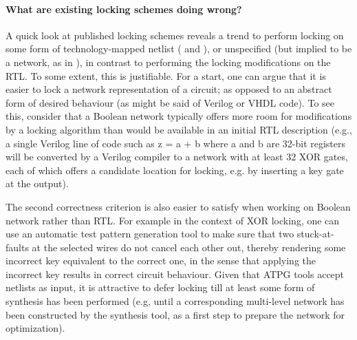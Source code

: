 
\paragraph{What are existing locking schemes doing wrong?} A quick look at published locking schemes reveals a trend to perform locking on some form of technology-mapped netlist (\cite{} and \cite{}), or unspecified (but implied to be a network, as in \cite{}), in contrast to performing the locking modifications on the RTL. To some extent, this is justifiable. For a start, one can argue that it is easier to lock a network representation of a circuit; as opposed to an abstract form of desired behaviour (as might be said of Verilog or VHDL code). To see this, consider that a Boolean network typically offers more room for modifications by a locking algorithm than would be available in an initial RTL description (e.g., a single Verilog line of code such as z = a + b where a and b are 32-bit registers will be converted by a Verilog compiler to a network with at least 32 XOR gates, each of which offers a candidate location for locking, e.g. by inserting a key gate at the output). 

The second correctness criterion is also easier to satisfy when working on Boolean network rather than RTL. For example in the context of XOR locking, one can use an automatic test pattern generation tool to make sure that two stuck-at-faults at the selected wires do not cancel each other out, thereby rendering some incorrect key equivalent to the correct one, in the sense that applying the incorrect key results in correct circuit behaviour. Given that ATPG tools accept netlists as input, it is attractive to defer locking till at least some form of synthesis has been performed (e.g, until a corresponding multi-level network has been constructed by the synthesis tool, as a first step to prepare the network for optimization).


